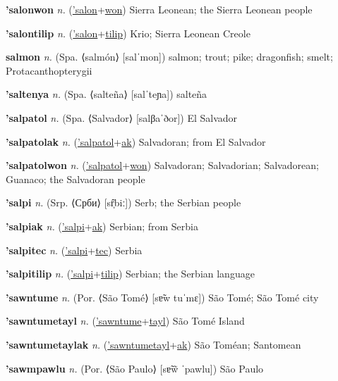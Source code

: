 \textbf{\hypertarget{'salonwon}{'salonwon}} \textit{n.} (\hyperlink{'salon}{'salon}+\allowbreak \hyperlink{won}{won})
Sierra Leonean; the Sierra Leonean people

\textbf{\hypertarget{'salontilip}{'salontilip}} \textit{n.} (\hyperlink{'salon}{'salon}+\allowbreak \hyperlink{tilip}{tilip})
Krio; Sierra Leonean Creole

\textbf{\hypertarget{salmon}{salmon}} \textit{n.} (Spa. ⟨salmón⟩ [salˈmon])
salmon; trout; pike; dragonfish; smelt; Protacanthopterygii

\textbf{\hypertarget{'saltenya}{'saltenya}} \textit{n.} (Spa. ⟨salteña⟩ [salˈteɲa])
salteña

\textbf{\hypertarget{'salpatol}{'salpatol}} \textit{n.} (Spa. ⟨Salvador⟩ [salβaˈðor])
El Salvador

\textbf{\hypertarget{'salpatolak}{'salpatolak}} \textit{n.} (\hyperlink{'salpatol}{'salpatol}+\allowbreak \hyperlink{ak}{ak})
Salvadoran; from El Salvador

\textbf{\hypertarget{'salpatolwon}{'salpatolwon}} \textit{n.} (\hyperlink{'salpatol}{'salpatol}+\allowbreak \hyperlink{won}{won})
Salvadoran; Salvadorian; Salvadorean; Guanaco; the Salvadoran people

\textbf{\hypertarget{'salpi}{'salpi}} \textit{n.} (Srp. ⟨Срби⟩ [sr̩̂biː])
Serb; the Serbian people

\textbf{\hypertarget{'salpiak}{'salpiak}} \textit{n.} (\hyperlink{'salpi}{'salpi}+\allowbreak \hyperlink{ak}{ak})
Serbian; from Serbia

\textbf{\hypertarget{'salpitec}{'salpitec}} \textit{n.} (\hyperlink{'salpi}{'salpi}+\allowbreak \hyperlink{tec}{tec})
Serbia

\textbf{\hypertarget{'salpitilip}{'salpitilip}} \textit{n.} (\hyperlink{'salpi}{'salpi}+\allowbreak \hyperlink{tilip}{tilip})
Serbian; the Serbian language

\textbf{\hypertarget{'sawntume}{'sawntume}} \textit{n.} (Por. ⟨São Tomé⟩ [sɐ̃w tuˈmɛ])
São Tomé; São Tomé city

\textbf{\hypertarget{'sawntumetayl}{'sawntumetayl}} \textit{n.} (\hyperlink{'sawntume}{'sawntume}+\allowbreak \hyperlink{tayl}{tayl})
São Tomé Island

\textbf{\hypertarget{'sawntumetaylak}{'sawntumetaylak}} \textit{n.} (\hyperlink{'sawntumetayl}{'sawntumetayl}+\allowbreak \hyperlink{ak}{ak})
São Toméan; Santomean

\textbf{\hypertarget{'sawmpawlu}{'sawmpawlu}} \textit{n.} (Por. ⟨São Paulo⟩ [sɐ̃w̃ ˈpawlu])
São Paulo

